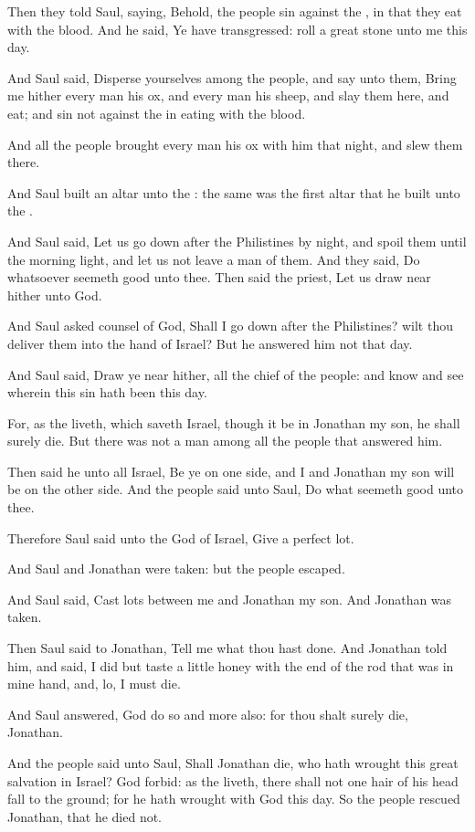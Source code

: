 \verse Then they told Saul, saying, Behold, the people sin against the \LORD, in that they eat with the blood. And he said, Ye have transgressed: roll a great stone unto me this day.

\verse And Saul said, Disperse yourselves among the people, and say unto them, Bring me hither every man his ox, and every man his sheep, and slay them here, and eat; and sin not against the \LORD in eating with the blood.

And all the people brought every man his ox with him that night, and slew them there.

\verse And Saul built an altar unto the \LORD: the same was the first altar that he built unto the \LORD.

\verse And Saul said, Let us go down after the Philistines by night, and spoil them until the morning light, and let us not leave a man of them. And they said, Do whatsoever seemeth good unto thee. Then said the priest, Let us draw near hither unto God.

\verse And Saul asked counsel of God, Shall I go down after the Philistines? wilt thou deliver them into the hand of Israel? But he answered him not that day.

\verse And Saul said, Draw ye near hither, all the chief of the people: and know and see wherein this sin hath been this day.

\verse For, as the \LORD liveth, which saveth Israel, though it be in Jonathan my son, he shall surely die. But there was not a man among all the people that answered him.

\verse Then said he unto all Israel, Be ye on one side, and I and Jonathan my son will be on the other side. And the people said unto Saul, Do what seemeth good unto thee.

\verse Therefore Saul said unto the \LORD God of Israel, Give a perfect lot.

And Saul and Jonathan were taken: but the people escaped.

\verse And Saul said, Cast lots between me and Jonathan my son. And Jonathan was taken.

\verse Then Saul said to Jonathan, Tell me what thou hast done. And Jonathan told him, and said, I did but taste a little honey with the end of the rod that was in mine hand, and, lo, I must die.

\verse And Saul answered, God do so and more also: for thou shalt surely die, Jonathan.

\verse And the people said unto Saul, Shall Jonathan die, who hath wrought this great salvation in Israel? God forbid: as the \LORD liveth, there shall not one hair of his head fall to the ground; for he hath wrought with God this day. So the people rescued Jonathan, that he died not.

